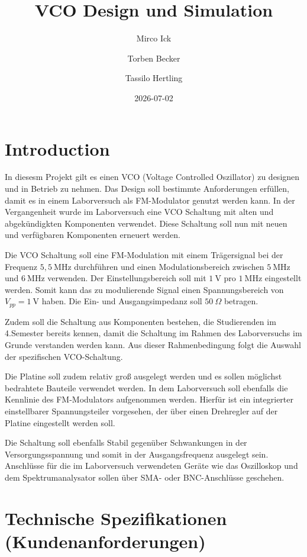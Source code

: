 \documentclass[
  ngerman,
  11pt,
  a4paper,
  DIV=11,
  twoside]{scrreprt}
\title{VCO Design und Simulation}
\author{Mirco Ick \and Torben Becker \and Tassilo Hertling}
\date{2026-07-02}
\renewcommand*\contentsname{Inhaltsverzeichnis}
\newcommand\contentsname{Inhaltsverzeichnis}
\begin{document}
\maketitle

\renewcommand*\contentsname{Inhaltsverzeichnis}
{
\setcounter{tocdepth}{2}
\tableofcontents
}

\chapter{Introduction}\label{introduction}

In diesesm Projekt gilt es einen VCO (Voltage Controlled Oszillator) zu
designen und in Betrieb zu nehmen. Das Design soll bestimmte
Anforderungen erfüllen, damit es in einem Laborversuch als FM-Modulator
genutzt werden kann. In der Vergangenheit wurde im Laborversuch eine VCO
Schaltung mit alten und abgekündigkten Komponenten verwendet. Diese
Schaltung soll nun mit neuen und verfügbaren Komponenten erneuert
werden.

Die VCO Schaltung soll eine FM-Modulation mit einem Trägersignal bei der
Frequenz \(5,5~\text{MHz}\) durchführen und einen Modulationsbereich
zwischen \(5~\text{MHz}\) und \(6~\text{MHz}\) verwenden. Der
Einstellungsbereich soll mit \(1~\text{V}\) pro \(1~\text{MHz}\)
eingestellt werden. Somit kann das zu modulierende Signal einen
Spannungsbereich von \(V_{pp} = 1~\text{V}\) haben. Die Ein- und
Ausgangsimpedanz soll \(50~\Omega\) betragen.

Zudem soll die Schaltung aus Komponenten bestehen, die Studierenden im
4.Semester bereits kennen, damit die Schaltung im Rahmen des
Laborversuchs im Grunde verstanden werden kann. Aus dieser
Rahmenbedingung folgt die Auswahl der spezifischen VCO-Schaltung.

Die Platine soll zudem relativ groß ausgelegt werden und es sollen
möglichst bedrahtete Bauteile verwendet werden. In dem Laborversuch soll
ebenfalls die Kennlinie des FM-Modulators aufgenommen werden. Hierfür
ist ein integrierter einstellbarer Spannungsteiler vorgesehen, der über
einen Drehregler auf der Platine eingestellt werden soll.

Die Schaltung soll ebenfalls Stabil gegenüber Schwankungen in der
Versorgungsspannung und somit in der Ausgangsfrequenz ausgelegt sein.
Anschlüsse für die im Laborversuch verwendeten Geräte wie das
Oszilloskop und dem Spektrumanalysator sollen über SMA- oder
BNC-Anschlüsse geschehen.

\chapter{Technische Spezifikationen
(Kundenanforderungen)}\label{technische-spezifikationen-kundenanforderungen}
\end{document}
